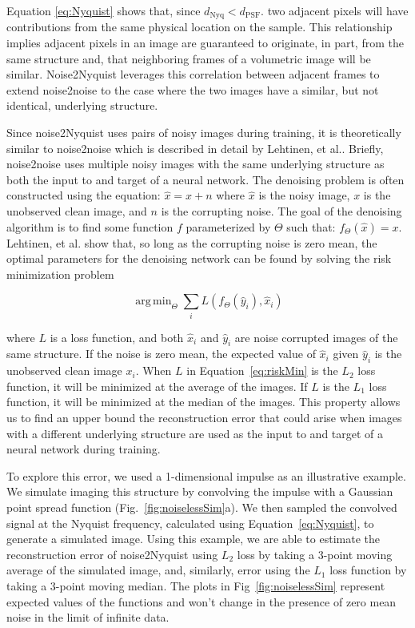 \documentclass[12pt]{spieman}
\DeclareMathOperator*{\argmin}{arg\,min} %
\begin{document}
\begin{spacing}{2}
Equation \ref{eq:Nyquist} shows that, since $d_{\mbox{Nyq}} < d_{\mbox{PSF}}$. two adjacent pixels will have contributions from the same physical location on the sample. This relationship implies adjacent pixels in an image are guaranteed to originate, in part, from the same structure and, that neighboring frames of a volumetric image will be similar. Noise2Nyquist leverages this correlation between adjacent frames to extend noise2noise to the case where the two images have a similar, but not identical, underlying structure.

Since noise2Nyquist uses pairs of noisy images during training, it is theoretically similar to noise2noise which is described in detail by Lehtinen, et al.\cite{Lehtinen2018a}. Briefly, noise2noise uses multiple noisy images with the same underlying structure as both the input to and target of a neural network. The denoising problem is often constructed using the equation: $\hat{x}=x+n$ where $\hat{x}$ is the noisy image, $x$ is the unobserved clean image, and $n$ is the corrupting noise. The goal of the denoising algorithm is to find some function $f$ parameterized by $\Theta$ such that: $f_\Theta(\hat{x}) = x$. Lehtinen, et al. show that, so long as the corrupting noise is zero mean, the optimal parameters for the denoising network can be found by solving the risk minimization problem

\begin{equation}
	\argmin_\Theta \sum_i L(f_\Theta(\hat{y}_i),\hat{x}_i)
    \label{eq:riskMin}	
\end{equation}

where $L$ is a loss function, and both $\hat{x}_i$ and $\hat{y}_i$ are noise corrupted images of the same structure. If the noise is zero mean, the expected value of $\hat{x}_i$ given $\hat{y}_i$ is the unobserved clean image $x_i$. When $L$ in Equation~\ref{eq:riskMin} is the $L_2$ loss function, it will be minimized at the average of the images. If $L$ is the $L_1$ loss function, it will be minimized at the median of the images. This property allows us to find an upper bound the reconstruction error that could arise when images with a different underlying structure are used as the input to and target of a neural network during training. 

To explore this error, we used a 1-dimensional impulse as an illustrative example. We simulate imaging this structure by convolving the impulse with a Gaussian point spread function (Fig.~\ref{fig:noiselessSim}a). We then sampled the convolved signal at the Nyquist frequency, calculated using Equation~\ref{eq:Nyquist}, to generate a simulated image. Using this example, we are able to estimate the reconstruction error of noise2Nyquist using $L_2$ loss by taking a 3-point moving average of the simulated image, and, similarly, error using the $L_1$ loss function by taking a 3-point moving median. The plots in Fig~\ref{fig:noiselessSim} represent expected values of the functions and won't change in the presence of zero mean noise in the limit of infinite data.


\end{spacing}
\end{document}
